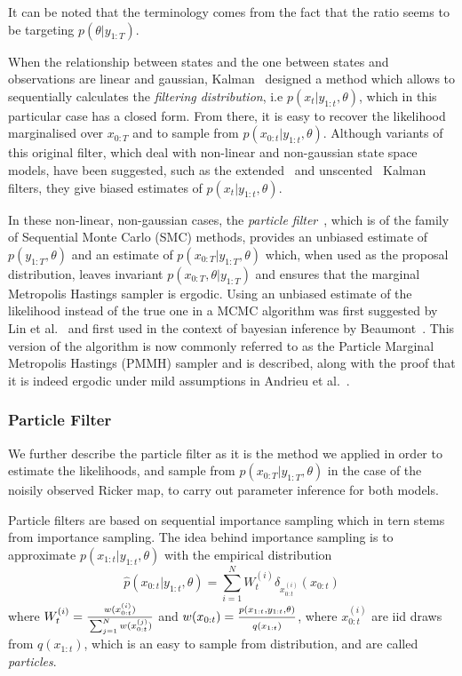 \documentclass[12pt]{article}
\begin{document}
	It can be noted that the terminology comes from the fact that the ratio seems to be targeting $p(\theta | y_{1:T})$.
	
 	When the relationship between states and the one between states and observations are linear and gaussian, Kalman~\cite{Kalman1960} designed a method which allows to sequentially calculates the \emph{filtering distribution}, i.e $p(x_{t}| y_{1:t}, \theta)$, which in this particular case has a closed form. From there, it is easy to recover the likelihood marginalised over $x_{0:T}$ and to sample from $p(x_{0:t}| y_{1:t}, \theta)$. Although variants of this original filter, which deal with non-linear and non-gaussian state space models, have been suggested, such as the extended~\cite{McElhoe1966} and unscented~\cite{Julier1997} Kalman filters, they give biased estimates of $p(x_t|y_{1:t}, \theta)$. 
 	
 	In these non-linear, non-gaussian cases, the \emph{particle filter}~\cite{Gordon1993}, which is of the family of Sequential Monte Carlo (SMC) methods, provides an unbiased estimate of $p(y_{1:T}, \theta)$ and an estimate of $p(x_{0:T}|y_{1:T}, \theta)$ which, when used as the proposal distribution, leaves invariant $p(x_{0:T}, \theta|y_{1:T})$ and ensures that the marginal Metropolis Hastings sampler is ergodic. Using an unbiased estimate of the likelihood instead of the true one in a MCMC algorithm was first suggested by Lin et al.~\cite{lin2000noisy} and first used in the context of bayesian inference by Beaumont~\cite{beaumont2003estimation}. This version of the algorithm is now commonly referred to as the Particle Marginal Metropolis Hastings (PMMH) sampler and is described, along with the proof that it is indeed ergodic under mild assumptions in Andrieu et al.~\cite{andrieu2010particle}.
	
	\subsubsection{Particle Filter}
	We further describe the particle filter as it is the method we applied in order to estimate the likelihoods, and sample from $p(x_{0:T}|y_{1:T}, \theta)$ in the case of the noisily observed Ricker map, to carry out parameter inference for both models.
	
	Particle filters are based on sequential importance sampling which in tern stems from importance sampling.
	The idea behind importance sampling is to approximate $p(x_{1:t}|y_{1:t}, \theta)$ with the empirical distribution
	\begin{equation}
	\hat{p}(x_{0:t}|y_{1:t}, \theta) = \sum_{i=1}^{N}W_t^{(i)} \delta_{x_{0:t}^{(i)}}(x_{0:t})
	\end{equation}
	where $W_t^{(i)} = \frac{\strut w(x_{0:t}^{(i)})}{\strut \sum_{j=1}^{N} w(x_{0:t}^{(j)})}$ and $w(x_{0:t}) = \frac{\strut p(x_{1:t},y_{1:t}, \theta)}{\strut q(x_{1:t})}$, where $x_{0:t}^{(i)}$ are iid draws from $q(x_{1:t})$, which is an easy to sample from distribution, and are called \emph{particles}.
	
\end{document}
